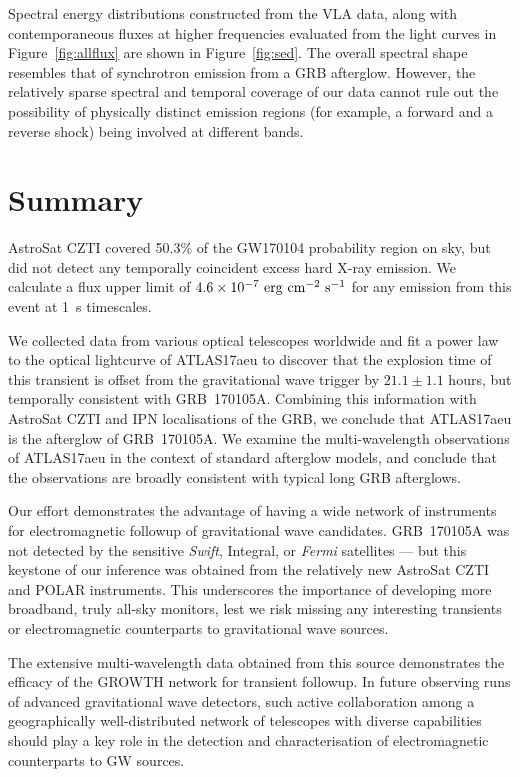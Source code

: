 \documentclass[twocolumn]{aastex6}
\begin{document}
Spectral energy distributions constructed from the VLA data, along with 
contemporaneous fluxes at higher frequencies evaluated from the light 
curves in Figure~\ref{fig:allflux} are shown in Figure~\ref{fig:sed}.  The overall spectral shape resembles that of synchrotron emission from a GRB afterglow.  However, the relatively sparse 
spectral and temporal coverage of our data cannot rule out the 
possibility of physically distinct emission regions (for example, a
forward and a reverse shock) being involved at 
different bands.

\section{Summary}
AstroSat CZTI covered 50.3\% of the GW170104 probability region on sky, but did not detect any temporally coincident excess hard X-ray emission. We calculate a flux upper limit of $4.6 \times 10^{-7}~{\rm erg~cm}^{-2}{\rm~s}^{-1}$ for any emission from this event at 1~s timescales.

We collected data from various optical telescopes worldwide and fit a power law to the optical lightcurve of ATLAS17aeu to discover that the explosion time of this transient is offset from the gravitational wave trigger by $21.1 \pm 1.1$ hours, but temporally consistent with GRB~170105A. Combining this information with AstroSat CZTI and IPN localisations of the GRB, we conclude that ATLAS17aeu is the afterglow of GRB~170105A. We examine the multi-wavelength observations of ATLAS17aeu in the context of standard afterglow models, and conclude that the observations are broadly consistent with typical long GRB afterglows.

Our effort demonstrates the advantage of having a wide network of instruments for electromagnetic followup of gravitational wave candidates. GRB~170105A was not detected by the sensitive {\em Swift}, Integral, or {\em Fermi} satellites --- but this keystone of our inference was obtained from the relatively new AstroSat CZTI and POLAR instruments. 
This underscores the importance of developing more broadband, truly all-sky monitors, lest we risk missing any interesting transients or electromagnetic counterparts to gravitational wave sources. 

The extensive multi-wavelength data obtained from this source demonstrates the efficacy of the GROWTH network for transient followup. 
In future observing runs of advanced gravitational wave detectors, such active collaboration among a geographically well-distributed network of telescopes with diverse capabilities should play a key role in the detection and characterisation of electromagnetic counterparts to GW sources. 
\end{document}

